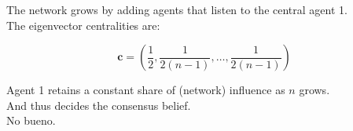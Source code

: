 \documentclass[preview, border={0pt 5pt 0pt 1pt}, varwidth=10cm]{standalone} %
\begin{document}




    The network grows by adding agents that listen to the central agent 1.\\

    The eigenvector centralities are:

    \[
        \bm{c} = \left(\frac{1}{2}, \frac{1}{2(n-1)}, \dots , \frac{1}{2(n-1)}\right)
    \]

    Agent 1 retains a constant share of (network) influence as \(n\) grows.\\

    And thus decides the consensus belief.\\

    No bueno.
\end{document}
